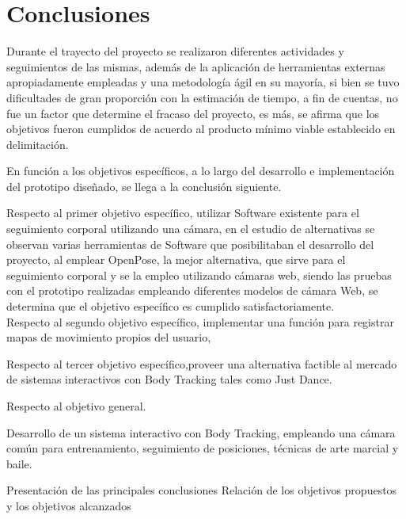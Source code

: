 \chapter{Conclusiones}


Durante el trayecto del proyecto se realizaron diferentes actividades y seguimientos de las mismas, además de la aplicación de herramientas externas apropiadamente empleadas y una metodología ágil en su mayoría, si bien se tuvo dificultades de gran proporción con la estimación de tiempo, a fin de cuentas, no fue un factor que determine el fracaso del proyecto, es más, se afirma que los objetivos fueron cumplidos de acuerdo al producto mínimo viable establecido en delimitación.

En función a los objetivos específicos, a lo largo del desarrollo e implementación del prototipo diseñado, se llega a la conclusión siguiente.

Respecto al primer objetivo específico, utilizar Software existente para el seguimiento corporal utilizando una cámara, en el estudio de alternativas se observan varias herramientas de Software que posibilitaban el desarrollo del proyecto, al emplear OpenPose, la mejor alternativa, que sirve para el seguimiento corporal y se la empleo utilizando cámaras web, siendo las pruebas con el prototipo realizadas empleando diferentes modelos de cámara Web, se determina que el objetivo específico es cumplido satisfactoriamente.
\\

Respecto al segundo objetivo específico, implementar una función para registrar mapas de movimiento propios del usuario,


Respecto al tercer objetivo específico,proveer una alternativa factible al mercado de sistemas interactivos con Body Tracking tales como Just Dance.


Respecto al objetivo general.


Desarrollo de un sistema interactivo con Body Tracking, empleando una cámara común para entrenamiento, seguimiento de posiciones, técnicas de arte marcial y baile.

Presentación de las principales conclusiones
Relación de los objetivos propuestos y los objetivos
alcanzados